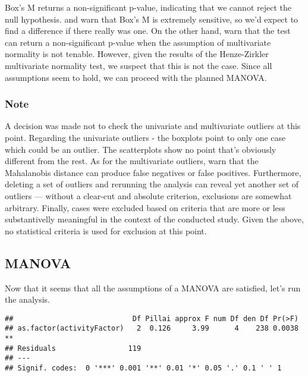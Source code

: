 \documentclass[12pt,]{article}
\begin{document}
Box's M returns a non-significant p-value, indicating that we cannot
reject the null hypothesis. \citet{field_discovering_2012} and
\citet{raykov_introduction_2008} warn that Box's M is extremely
sensitive, so we'd expect to find a difference if there really was one.
On the other hand, \citet{field_discovering_2012} warn that the test can
return a non-significant p-value when the assumption of multivariate
normality is not tenable. However, given the results of the
Henze-Zirkler multivariate normality test, we suspect that this is not
the case. Since all assumptions seem to hold, we can proceed with the
planned MANOVA.

\hypertarget{note}{%
\subsubsection{Note}\label{note}}

A decision was made not to check the univariate and multivariate
outliers at this point. Regarding the univariate outliers - the boxplots
point to only one case which could be an outlier. The scatterplots show
no point that's obviously different from the rest. As for the
multivariate outliers, \citet{tabachnick_using_2012} warn that the
Mahalanobis distance can produce false negatives or false positives.
Furthermore, deleting a set of outliers and rerunning the analysis can
reveal yet another set of outliers --- without a clear-cut and absolute
criterion, exclusions are somewhat arbitrary. Finally, cases were
excluded based on criteria that are more or less substantivelly
meaningful in the context of the conducted study. Given the above, no
statistical criteria is used for exclusion at this point.

\hypertarget{manova}{%
\subsection{MANOVA}\label{manova}}

Now that it seems that all the assumptions of a MANOVA are satisfied,
let's run the analysis.

\begin{verbatim}
##                            Df Pillai approx F num Df den Df Pr(>F)   
## as.factor(activityFactor)   2  0.126     3.99      4    238 0.0038 **
## Residuals                 119                                        
## ---
## Signif. codes:  0 '***' 0.001 '**' 0.01 '*' 0.05 '.' 0.1 ' ' 1
\end{verbatim}
\end{document}
